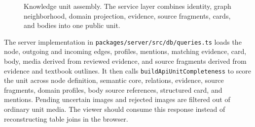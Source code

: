\documentclass[11pt,letterpaper]{article}
\newcommand{\code}[1]{\nolinkurl{#1}}
\begin{document}
\begin{figure}[H]
\centering
{}
\caption{Knowledge unit assembly. The service layer combines identity, graph neighborhood, domain projection, evidence, source fragments, cards, and bodies into one public unit.}
\label{fig:unit}
\end{figure}

The server implementation in \code{packages/server/src/db/queries.ts} loads the node, outgoing and incoming edges, profiles, mentions, matching evidence, card, body, media derived from reviewed evidence, and source fragments derived from evidence and textbook outlines. It then calls \code{buildApiUnitCompleteness} to score the unit across node definition, semantic core, relations, evidence, source fragments, domain profiles, body source references, structured card, and mentions. Pending uncertain images and rejected images are filtered out of ordinary unit media. The viewer should consume this response instead of reconstructing table joins in the browser.
\end{document}
